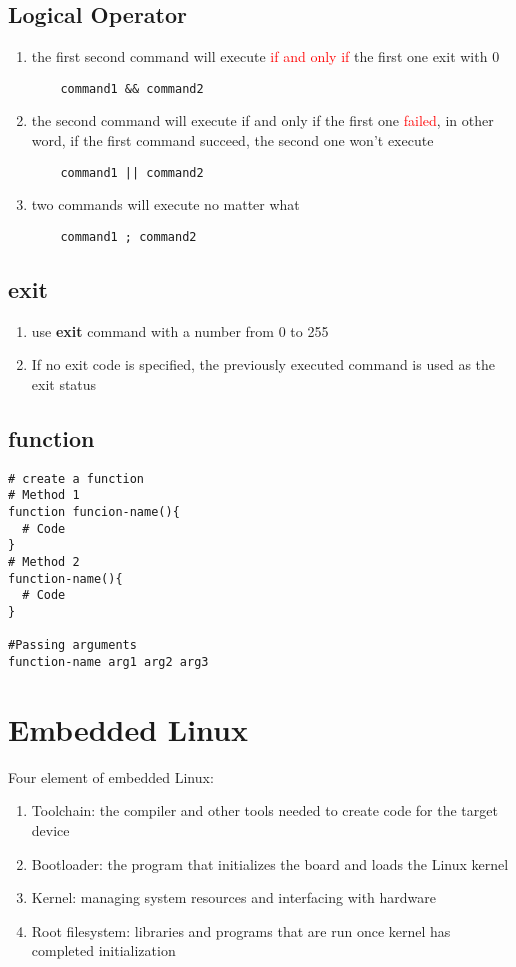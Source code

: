 \documentclass[12pt,a4paper]{article}
\newcommand{\rt}[1]{\textcolor{red}{#1}}
\begin{document}
\subsection{Logical Operator}
\begin{enumerate}
	\item the first second command will execute \rt{if and only if} the first one exit with 0
	\begin{verbatim}
	command1 && command2
	\end{verbatim}
	\item the second command will execute if and only if the first one \rt{failed}, in other word, if the first command succeed, the second one won't execute
	\begin{verbatim}
	command1 || command2
	\end{verbatim}
	\item two commands will execute no matter what
	\begin{verbatim}
	command1 ; command2
	\end{verbatim}
\end{enumerate}

\subsection{exit}
\begin{enumerate}
	\item use \textbf{exit} command with a number from 0 to 255
	\item If no exit code is specified, the previously executed command is used as the exit status
\end{enumerate}

\subsection{function}
\begin{footnotesize}
\begin{verbatim}
# create a function
# Method 1
function funcion-name(){
  # Code
}
# Method 2
function-name(){
  # Code
}

#Passing arguments
function-name arg1 arg2 arg3
\end{verbatim}
\end{footnotesize}

\section{Embedded Linux}
Four element of embedded Linux:
\begin{enumerate}
	\item Toolchain: the compiler and other tools needed to create code for the target device
	\item Bootloader: the program that initializes the board and loads the Linux kernel
	\item Kernel: managing system resources and interfacing with hardware
	\item Root filesystem: libraries and programs that are run once kernel has completed initialization
\end{enumerate}
\end{document}
